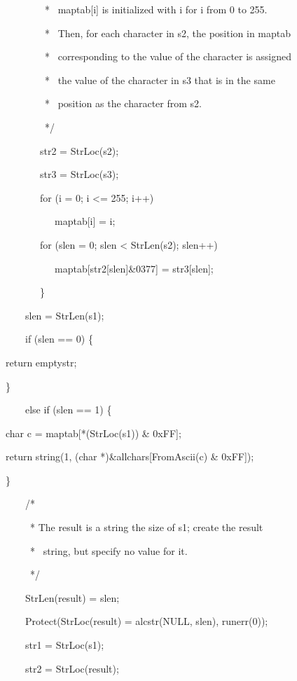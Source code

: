 \ \ \ \ \ \ \ \ \ \ * \ maptab[i] is initialized with i for i from 0 to 255.


\ \ \ \ \ \ \ \ \ \ * \ Then, for each character in s2, the position in maptab


\ \ \ \ \ \ \ \ \ \ * \ corresponding to the value of the character is assigned


\ \ \ \ \ \ \ \ \ \ * \ the value of the character in s3 that is in the same


\ \ \ \ \ \ \ \ \ \ * \ position as the character from s2.


\ \ \ \ \ \ \ \ \ \ */


\ \ \ \ \ \ \ \ \ str2 = StrLoc(s2);


\ \ \ \ \ \ \ \ \ str3 = StrLoc(s3);


\ \ \ \ \ \ \ \ \ for (i = 0; i {\textless}= 255; i++)


\ \ \ \ \ \ \ \ \ \ \ \ maptab[i] = i;


\ \ \ \ \ \ \ \ \ for (slen = 0; slen {\textless} StrLen(s2); slen++)


\ \ \ \ \ \ \ \ \ \ \ \ maptab[str2[slen]\&0377] = str3[slen];


\ \ \ \ \ \ \ \ \ \}


\bigskip


\ \ \ \ \ \ slen = StrLen(s1);


\bigskip


\ \ \ \ \ \ if (slen == 0) \{


\ \  return emptystr;


\ \  \}


\ \ \ \ \ \ else if (slen == 1) \{


\ \  char c = maptab[*(StrLoc(s1)) \& 0xFF];


\ \  return string(1, (char *)\&allchars[FromAscii(c) \& 0xFF]);


\ \  \}


\bigskip


\ \ \ \ \ \ /*


\ \ \ \ \ \ \ * The result is a string the size of s1; create the result


\ \ \ \ \ \ \ * \ string, but specify no value for it.


\ \ \ \ \ \ \ */


\ \ \ \ \ \ StrLen(result) = slen;


\ \ \ \ \ \ Protect(StrLoc(result) = alcstr(NULL, slen), runerr(0));


\ \ \ \ \ \ str1 = StrLoc(s1);


\ \ \ \ \ \ str2 = StrLoc(result);


